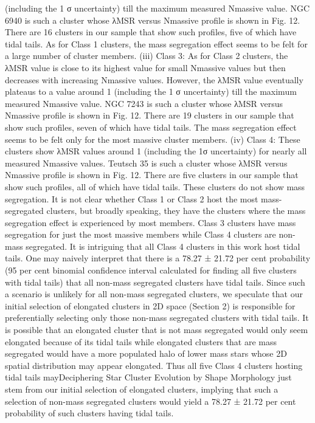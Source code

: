 \documentclass[../Main.tex]{subfiles}
\begin{document}
{(including the 1 σ uncertainty) till the maximum measured Nmassive
value. NGC 6940 is such a cluster whose λMSR versus Nmassive profile
is shown in Fig. 12. There are 16 clusters in our sample that show
such profiles, five of which have tidal tails. As for Class 1 clusters,
the mass segregation effect seems to be felt for a large number of
cluster members.
(iii) Class 3: As for Class 2 clusters, the λMSR value is close
to its highest value for small Nmassive values but then decreases
with increasing Nmassive values. However, the λMSR value eventually
plateaus to a value around 1 (including the 1 σ uncertainty) till
the maximum measured Nmassive value. NGC 7243 is such a cluster
whose λMSR versus Nmassive profile is shown in Fig. 12. There are 19
clusters in our sample that show such profiles, seven of which have
tidal tails. The mass segregation effect seems to be felt only for the
most massive cluster members.
(iv) Class 4: These clusters show λMSR values around 1 (including
the 1σ uncertainty) for nearly all measured Nmassive values.
Teutsch 35 is such a cluster whose λMSR versus Nmassive profile is
shown in Fig. 12. There are five clusters in our sample that show
such profiles, all of which have tidal tails. These clusters do not
show mass segregation.
It is not clear whether Class 1 or Class 2 host the most mass-
segregated clusters, but broadly speaking, they have the clusters
where the mass segregation effect is experienced by most members.
Class 3 clusters have mass segregation for just the most massive
members while Class 4 clusters are non-mass segregated. It is
intriguing that all Class 4 clusters in this work host tidal tails.
One may naively interpret that there is a 78.27 ± 21.72 per cent
probability (95 per cent binomial confidence interval calculated for
finding all five clusters with tidal tails) that all non-mass segregated
clusters have tidal tails. Since such a scenario is unlikely for all
non-mass segregated clusters, we speculate that our initial selection
of elongated clusters in 2D space (Section 2) is responsible for
preferentially selecting only those non-mass segregated clusters with
tidal tails. It is possible that an elongated cluster that is not mass
segregated would only seem elongated because of its tidal tails
while elongated clusters that are mass segregated would have a more
populated halo of lower mass stars whose 2D spatial distribution may
appear elongated. Thus all five Class 4 clusters hosting tidal tails mayDeciphering Star Cluster Evolution by Shape Morphology
just stem from our initial selection of elongated clusters, implying
that such a selection of non-mass segregated clusters would yield a
78.27 ± 21.72 per cent probability of such clusters having tidal tails.

}
\end{document}
